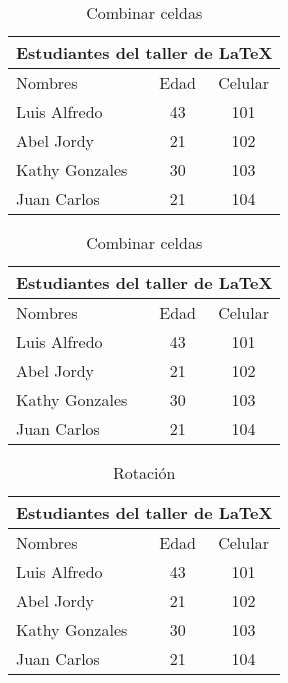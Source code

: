 \documentclass[11pt, a4paper]{article}
\begin{document}
\begin{table}
\begin{center}
\caption{Combinar celdas}
\vspace{1mm}
\begin{tabular}{|l|c|c|}
\hline
\multicolumn{3}{|c|}{Estudiantes del taller de \LaTeX } \\ \hline
Nombres & Edad & Celular \\ \hline
Luis Alfredo & 43 & 101 \\ \hline
Abel Jordy  & 21 &102\\  \hline
Kathy Gonzales & 30 &103\\ \hline
Juan Carlos & 21 &104\\ \hline
\end{tabular}
\end{center}
\end{table}

\begin{table}
\begin{center}
\caption{Combinar celdas}
\vspace{1mm}
\begin{tabular}{|l|c|c|}
\hline
\multicolumn{3}{|c|}{Estudiantes del taller de \LaTeX } \\ \hline
Nombres & Edad & Celular \\ \hline
Luis Alfredo & 43 & 101 \\ \cline{2-3}
Abel Jordy  & 21 &102\\ \cline{1-2}
Kathy Gonzales & 30 &103\\
Juan Carlos & 21 &104\\ \hline
\end{tabular}
\end{center}
\end{table}


\begin{table}[h]
\begin{center}
\begin{sideways}
\begin{tabular}{|l|c|c|}
\hline
\multicolumn{3}{|c|}{Estudiantes del taller de \LaTeX } \\ \hline
Nombres & Edad & Celular \\ \hline
Luis Alfredo & 43 & 101 \\ \cline{2-3}
Abel Jordy  & 21 &102\\ \cline{1-2}
Kathy Gonzales & 30 &103\\
Juan Carlos & 21 &104\\ \hline
\end{tabular}
\end{sideways}
\caption{Rotación}
\end{center}
\end{table}
\end{document}
